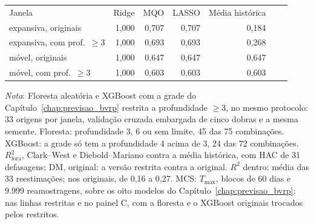 \begin{table}[H]
{\begin{tabular}{lrrrrrr}
Janela & Ridge & MQO & LASSO & Média histórica & & \\
expansiva, originais & 1{,}000 & 0{,}707 & 0{,}707 & 0{,}184 & & \\
expansiva, com prof.\ $\ge 3$ & 1{,}000 & 0{,}693 & 0{,}693 & 0{,}268 & & \\
móvel, originais & 1{,}000 & 0{,}647 & 0{,}647 & 0{,}647 & & \\
móvel, com prof.\ $\ge 3$ & 1{,}000 & 0{,}603 & 0{,}603 & 0{,}603 & & \\
\bottomrule
\end{tabular}}
\par\smallskip
\parbox{0.95\linewidth}{\footnotesize\textit{Nota}: Floresta aleatória e XGBoost com a grade do Capítulo~\ref{chap:previsao_bvrp} restrita a profundidade $\ge 3$, no mesmo protocolo: 33 origens por janela, validação cruzada embargada de cinco dobras e a mesma semente. Floresta: profundidade 3, 6 ou sem limite, 45 das 75 combinações. XGBoost: a grade só tem a profundidade 4 acima de 3, 24 das 72 combinações. $R^2_{\text{fora}}$, Clark--West e Diebold--Mariano contra a média histórica, com HAC de 31 defasagens; DM, original: a versão restrita contra a original. $R^2$ dentro: média das 33 reestimações; nos originais, de 0{,}16 a 0{,}27. MCS: $T_{\max}$, blocos de 60 dias e 9.999 reamostragens, sobre os oito modelos do Capítulo~\ref{chap:previsao_bvrp}; nas linhas restritas e no painel C, com a floresta e o XGBoost originais trocados pelos restritos.}
\end{table}
